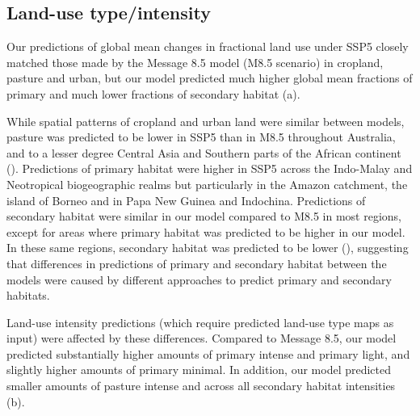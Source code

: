\documentclass[titlesmallcaps,copyrightpage]{uomthesis}\usepackage[]{graphicx}\usepackage[]{color}
\begin{document}
\subsection{Land-use type/intensity}
Our predictions of global mean changes in fractional land use under SSP5 closely matched those made by the Message 8.5 model (M8.5 scenario) in cropland, pasture and urban, but our model predicted much higher global mean fractions of primary and much lower fractions of secondary habitat (a).

While spatial patterns of cropland and urban land were similar between models, pasture was predicted to be lower in SSP5 than in M8.5 throughout Australia, and to a lesser degree Central Asia and Southern parts of the African continent (). Predictions of primary habitat were higher in SSP5 across the Indo-Malay and Neotropical biogeographic realms but particularly in the Amazon catchment, the island of Borneo and in Papa New Guinea and Indochina. Predictions of secondary habitat were similar in our model compared to M8.5 in most regions, except for areas where primary habitat was predicted to be higher in our model. In these same regions, secondary habitat was predicted to be lower (), suggesting that differences in predictions of primary and secondary habitat between the models were caused by different approaches to predict primary and secondary habitats.

Land-use intensity predictions (which require predicted land-use type maps as input) were affected by these differences. Compared to Message 8.5, our model predicted substantially higher amounts of primary intense and primary light, and slightly higher amounts of primary minimal. In addition, our model predicted smaller amounts of pasture intense and across all secondary habitat intensities (b).
\end{document}
